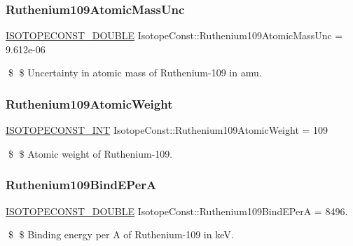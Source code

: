 \subsubsection{\texorpdfstring{Ruthenium109\+Atomic\+Mass\+Unc}{Ruthenium109AtomicMassUnc}}
{\footnotesize\ttfamily \mbox{\hyperlink{group___isotope_const-_macros_ga8f45a7272ce02c0b4c65c44636ed719a}{I\+S\+O\+T\+O\+P\+E\+C\+O\+N\+S\+T\+\_\+\+D\+O\+U\+B\+LE}} Isotope\+Const\+::\+Ruthenium109\+Atomic\+Mass\+Unc = 9.\+612e-\/06}

\$ \$ Uncertainty in atomic mass of Ruthenium-\/109 in amu. \mbox{\label{group___isotope_const-_ruthenium-_ru109_gafb52bdb3a581fb20e094b9b9da11c1fb}} 
\subsubsection{\texorpdfstring{Ruthenium109\+Atomic\+Weight}{Ruthenium109AtomicWeight}}
{\footnotesize\ttfamily \mbox{\hyperlink{group___isotope_const-_macros_ga5f18360b3e99483a35c32d789e62621c}{I\+S\+O\+T\+O\+P\+E\+C\+O\+N\+S\+T\+\_\+\+I\+NT}} Isotope\+Const\+::\+Ruthenium109\+Atomic\+Weight = 109}

\$ \$ Atomic weight of Ruthenium-\/109. \mbox{\label{group___isotope_const-_ruthenium-_ru109_ga02360a813f5cba4c7c8c70fabd355543}} 
\subsubsection{\texorpdfstring{Ruthenium109\+Bind\+E\+PerA}{Ruthenium109BindEPerA}}
{\footnotesize\ttfamily \mbox{\hyperlink{group___isotope_const-_macros_ga8f45a7272ce02c0b4c65c44636ed719a}{I\+S\+O\+T\+O\+P\+E\+C\+O\+N\+S\+T\+\_\+\+D\+O\+U\+B\+LE}} Isotope\+Const\+::\+Ruthenium109\+Bind\+E\+PerA = 8496.}

\$ \$ Binding energy per A of Ruthenium-\/109 in keV. \mbox{\label{group___isotope_const-_ruthenium-_ru109_ga64fc6a000889e80db4a0484ce7ee6136}} 
